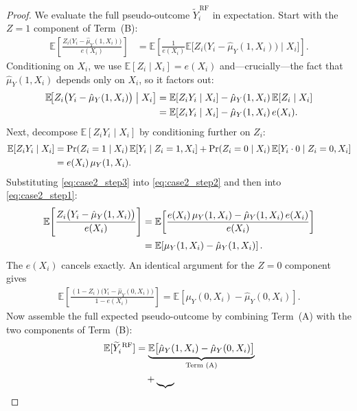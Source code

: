 \documentclass[12pt,a4paper]{article}
\theoremstyle{remark}
\newcommand{\E}{\mathbb{E}}
\newcommand{\muY}{\mu_Y}
\newcommand{\muYhat}{\hat{\mu}_Y}
\newcommand{\YRF}{\widetilde{Y}^{\,\mathrm{RF}}}
\begin{document}
\begin{proof}
We evaluate the full pseudo-outcome $\YRF_i$ in expectation. Start with the
$Z=1$ component of Term~(B):
\begin{align}
  \E\!\left[
    \frac{Z_i\bigl(Y_i - \muYhat(1,X_i)\bigr)}{e(X_i)}
  \right]
  &=
  \E\!\left[
    \frac{1}{e(X_i)}
    \E\!\bigl[Z_i\bigl(Y_i - \muYhat(1,X_i)\bigr) \;\big|\; X_i\bigr]
  \right].
  \label{eq:case2_step1}
\end{align}
Conditioning on $X_i$, we use $\E[Z_i \mid X_i] = e(X_i)$ and---crucially---the
fact that $\muYhat(1,X_i)$ depends only on $X_i$, so it factors out:
\begin{align}
  \E\!\bigl[Z_i\bigl(Y_i - \muYhat(1,X_i)\bigr) \;\big|\; X_i\bigr]
  &= \E[Z_i Y_i \mid X_i] - \muYhat(1,X_i)\,\E[Z_i \mid X_i]
  \notag \\
  &= \E[Z_i Y_i \mid X_i] - \muYhat(1,X_i)\,e(X_i).
  \label{eq:case2_step2}
\end{align}
Next, decompose $\E[Z_i Y_i \mid X_i]$ by conditioning further on $Z_i$:
\begin{align}
  \E[Z_i Y_i \mid X_i]
  &= \Pr(Z_i=1\mid X_i)\,\E[Y_i \mid Z_i=1, X_i]
  + \Pr(Z_i=0\mid X_i)\,\E[Y_i\cdot 0 \mid Z_i=0, X_i]
  \notag \\
  &= e(X_i)\,\muY(1,X_i).
  \label{eq:case2_step3}
\end{align}
Substituting \eqref{eq:case2_step3} into \eqref{eq:case2_step2} and then into
\eqref{eq:case2_step1}:
\begin{align}
  \E\!\left[
    \frac{Z_i\bigl(Y_i - \muYhat(1,X_i)\bigr)}{e(X_i)}
  \right]
  &=
  \E\!\left[
    \frac{e(X_i)\,\muY(1,X_i) - \muYhat(1,X_i)\,e(X_i)}{e(X_i)}
  \right]
  \notag \\
  &=
  \E\!\left[\muY(1,X_i) - \muYhat(1,X_i)\right].
  \label{eq:case2_step4}
\end{align}
The $e(X_i)$ cancels exactly. An identical argument for the $Z=0$ component gives
\begin{align}
  \E\!\left[
    \frac{(1-Z_i)\bigl(Y_i - \muYhat(0,X_i)\bigr)}{1-e(X_i)}
  \right]
  =
  \E\!\left[\muY(0,X_i) - \muYhat(0,X_i)\right].
  \label{eq:case2_step5}
\end{align}
Now assemble the full expected pseudo-outcome by combining Term~(A) with the
two components of Term~(B):
\begin{align}
  \E[\YRF_i]
  &=
  \underbrace{\E\bigl[\muYhat(1,X_i) - \muYhat(0,X_i)\bigr]}_{\text{Term (A)}}
  \notag \\
  &\quad
  +
  \underbrace{
}
\end{align}
\end{proof}
\end{document}
